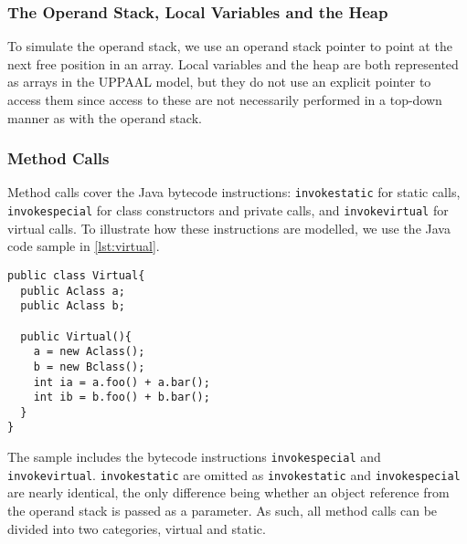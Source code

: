 \subsubsection{The Operand Stack, Local Variables and the Heap}
To simulate the operand stack, we use an operand stack pointer to point at the next free position in an array. Local variables and the heap are both represented as arrays in the UPPAAL model, but they do not use an explicit pointer to access them since access to these are not necessarily performed in a top-down manner as with the operand stack.

\subsubsection{Method Calls}\label{subsubsec:method}
Method calls cover the Java bytecode instructions: \texttt{invokestatic} for static calls, \texttt{invokespecial} for class constructors and private calls, and \texttt{invokevirtual} for virtual calls. To illustrate how these instructions are modelled, we use the Java code sample in \cref{lst:virtual}.
\begin{lstlisting}[caption={\texttt{Bclass} extends \texttt{Aclass}, \texttt{Aclass} implements the methods foo and bar, and \texttt{Bclass} overwrites foo.}, label={lst:virtual}]
public class Virtual{
  public Aclass a;
  public Aclass b;

  public Virtual(){
    a = new Aclass();
    b = new Bclass();
    int ia = a.foo() + a.bar();
    int ib = b.foo() + b.bar();
  }
}
\end{lstlisting}
The sample includes the bytecode instructions \texttt{invokespecial} and \texttt{invokevirtual}.
\texttt{invokestatic} are omitted as \texttt{invokestatic} and \texttt{invokespecial} are nearly identical, the only difference being whether an object reference from the operand stack is passed as a parameter.
As such, all method calls can be divided into two categories, virtual and static.

